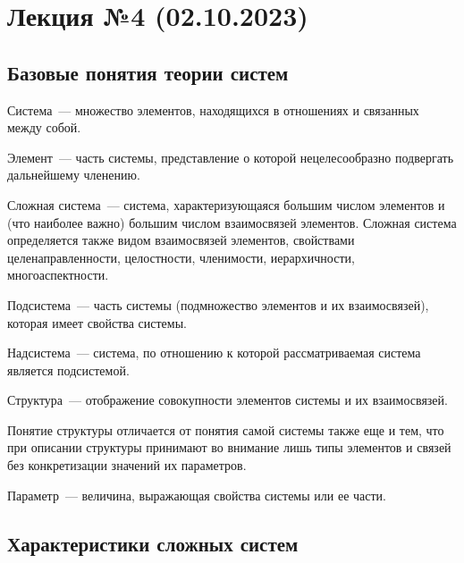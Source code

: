\section{Лекция №4 (02.10.2023)}

\subsection{Базовые понятия теории систем}

\begin{dd}
    Система~--- множество элементов, находящихся в отношениях и связанных между собой.
\end{dd}

\begin{dd}
    Элемент~--- часть системы, представление о которой нецелесообразно подвергать дальнейшему членению.
\end{dd}

\begin{dd}
    Сложная система~--- система, характеризующаяся большим числом элементов и (что наиболее важно) большим числом взаимосвязей элементов. Сложная система определяется также видом взаимосвязей элементов, свойствами целенаправленности, целостности, членимости, иерархичности, многоаспектности.
\end{dd}

\begin{dd}
    Подсистема~--- часть системы (подмножество элементов и их взаимосвязей), которая имеет свойства системы.
\end{dd}

\begin{dd}
    Надсистема~--- система, по отношению к которой рассматриваемая система является подсистемой.
\end{dd}

\begin{dd}
    Структура~--- отображение совокупности элементов системы и их взаимосвязей.
\end{dd}

Понятие структуры отличается от понятия самой системы также еще и тем, что при описании структуры принимают во внимание лишь типы элементов и связей без конкретизации значений их параметров.

\begin{dd}
    Параметр~--- величина, выражающая свойства системы или ее части.
\end{dd}

\subsection{Характеристики сложных систем}

